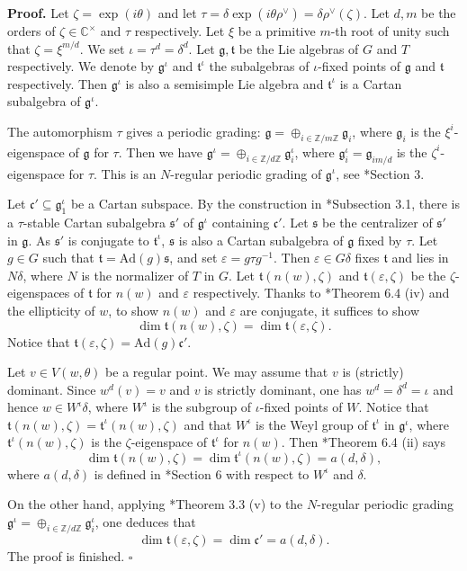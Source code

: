 \documentclass[10pt,leqno]{article}
\newcommand{\qed}{\hfill $\square$ \medskip}
\newenvironment{proof}[1][Proof]{\noindent\textbf{#1.} }{\qed}
\newcommand{\Ad}{\text{Ad}}
\renewcommand{\t}{\mathfrak t}
\def\fg{\mathfrak g}
\def\fc{\mathfrak c}
\def\ft{\mathfrak t}
\def\fs{\mathfrak s}
\def\d{\delta}
\def\t{\tau}
\def\z{\zeta}
\def\i{^{-1}}
\begin{document}
\begin{proof} Let $\zeta=\exp(i \theta)$ and let
$\t=\delta \exp(i \theta \rho^\vee)=\delta \rho^\vee(\zeta)$. Let $d,m$ be
the orders of $\zeta \in \mathbb C^\times$ and $\t$ respectively.
Let $\xi$ be a primitive $m$-th root of unity such that
$\zeta=\xi^{m/d}$. We set $\iota=\tau^d=\delta^d$. Let $\fg, \ft$ be
the Lie algebras of $G$ and $T$ respectively. We denote by
$\fg^\iota$ and $\ft^\iota$ the subalgebras of $\iota$-fixed points
of $\fg$ and $\ft$ respectively. Then $\fg^\iota$ is also a
semisimple Lie algebra and $\ft^\iota$ is a Cartan subalgebra of
$\fg^\iota$.

	The automorphism $\t$ gives a periodic grading: $\fg=\oplus_{i
\in \mathbb Z/m\mathbb Z} \fg_i$, where $\fg_i$ is the
$\xi^i$-eigenspace of $\fg$ for $\t$. Then we have $\fg^\iota =
\oplus_{i \in \mathbb Z / d\mathbb Z} \fg^\iota_i$, where
$\fg^\iota_i=\fg_{im/d}$ is the $\zeta^i$-eigenspace for $\t$. This is
an $N$-regular periodic grading of ${\fg}^{\iota}$, see
\cite{panyushev}*{Section 3}.
	
Let $\fc' \subseteq \fg^\iota_1$ be a Cartan subspace. By the
construction in \cite{rgly}*{Subsection 3.1}, there is a $\t$-stable
Cartan subalgebra $\fs'$ of $\fg^\iota$ containing $\fc'$. Let $\fs$
be the centralizer of $\fs'$ in $\fg$. As $\fs'$ is conjugate to
$\ft^\iota$, $\fs$ is also a Cartan subalgebra of $\fg$ fixed by
$\t$. Let $g \in G$ such that $\ft=\Ad(g) \fs$, and set $\varepsilon=g
\t g\i$. Then $\varepsilon \in G \d$ fixes $\ft$ and lies in $N \d$,
where $N$ is the normalizer of $T$ in $G$. Let $\ft(n(w), \z)$ and
$\ft(\varepsilon, \z)$ be the $\z$-eigenspaces of $\ft$ for $n(w)$ and
$\varepsilon$ respectively. Thanks to
\cite{springer_regular}*{Theorem 6.4 (iv)} and
the ellipticity of $w$, to show $n(w)$ and $\varepsilon$ are conjugate,
it suffices to show $$\dim \ft(n(w), \z)= \dim \ft(\varepsilon, \z).$$
Notice that $\ft(\varepsilon, \z)=\Ad(g) \fc'$.
	
	Let $v \in V(w, \theta)$ be a regular point. We may assume
that $v$ is (strictly) dominant. Since $w^d(v)=v$ and $v$ is strictly
dominant, one has $w^d=\d^d=\iota$ and hence $w \in W^\iota \d$, where
$W^\iota$ is the subgroup of $\iota$-fixed points of $W$. Notice that
$\ft(n(w), \z)=\ft^\iota(n(w), \z)$ and that $W^\iota$ is the Weyl group
of $\ft^\iota$ in $\fg^\iota$, where $\ft^\iota(n(w), \z)$ is the
$\z$-eigenspace of $\ft^\iota$ for $n(w)$. Then
\cite{springer_regular}*{Theorem 6.4 (ii)} says $$\dim \ft(n(w), \z) = \dim \ft^\iota(n(w), \z)=
a(d, \d),$$ where $a(d, \d)$ is defined in
\cite{springer_regular}*{Section 6} with
respect to $W^\iota$ and $\d$.
	
	On the other hand, applying \cite{panyushev}*{Theorem 3.3 (v)} to the
$N$-regular periodic grading $\fg^\iota = \oplus_{i \in \mathbb Z /
d\mathbb Z} \fg^\iota_i$, one deduces that $$\dim \ft(\varepsilon, \z)
= \dim \fc' = a(d, \d).$$ The proof is finished.
\end{proof}
\end{document}

